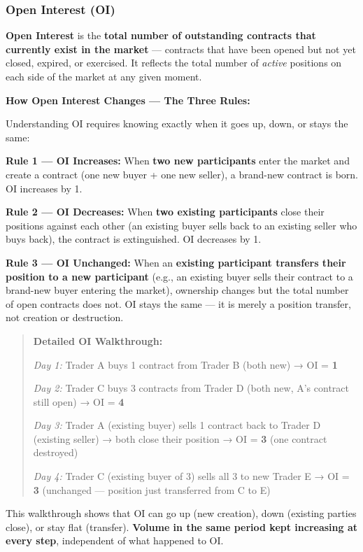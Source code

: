 \documentclass[12pt,openany]{book}
\begin{document}
\subsubsection{Open Interest (OI)}

\textbf{Open Interest} is the \textbf{total number of outstanding contracts that currently exist in the market} — contracts that have been opened but not yet closed, expired, or exercised. It reflects the total number of \emph{active} positions on each side of the market at any given moment.

\textbf{How Open Interest Changes — The Three Rules:}

Understanding OI requires knowing exactly when it goes up, down, or stays the same:

\textbf{Rule 1 — OI Increases:} When \textbf{two new participants} enter the market and create a contract (one new buyer + one new seller), a brand-new contract is born. OI increases by 1.

\textbf{Rule 2 — OI Decreases:} When \textbf{two existing participants} close their positions against each other (an existing buyer sells back to an existing seller who buys back), the contract is extinguished. OI decreases by 1.

\textbf{Rule 3 — OI Unchanged:} When an \textbf{existing participant transfers their position to a new participant} (e.g., an existing buyer sells their contract to a brand-new buyer entering the market), ownership changes but the total number of open contracts does not. OI stays the same — it is merely a position transfer, not creation or destruction.

\begin{quote}
\textbf{Detailed OI Walkthrough:}

\emph{Day 1:} Trader A buys 1 contract from Trader B (both new) → OI = \textbf{1}

\emph{Day 2:} Trader C buys 3 contracts from Trader D (both new, A's contract still open) → OI = \textbf{4}

\emph{Day 3:} Trader A (existing buyer) sells 1 contract back to Trader D (existing seller) → both close their position → OI = \textbf{3} (one contract destroyed)

\emph{Day 4:} Trader C (existing buyer of 3) sells all 3 to new Trader E → OI = \textbf{3} (unchanged — position just transferred from C to E)
\end{quote}

This walkthrough shows that OI can go up (new creation), down (existing parties close), or stay flat (transfer). \textbf{Volume in the same period kept increasing at every step}, independent of what happened to OI.
\end{document}
